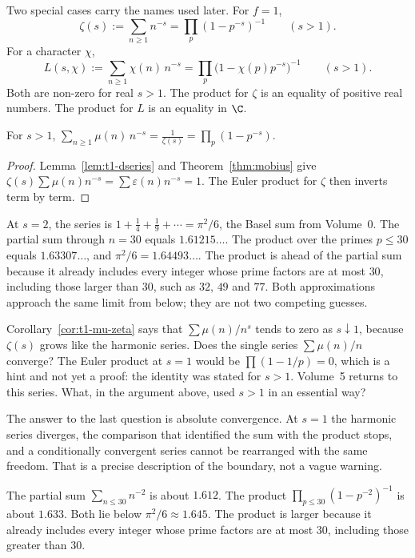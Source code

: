 Two special cases carry the names used later. For $f=1$,
\[
\zeta(s):=\sum_{n\ge1}n^{-s}=\prod_p(1-p^{-s})^{-1}\qquad(s>1).
\]
For a character $\chi$,
\[
L(s,\chi):=\sum_{n\ge1}\chi(n)\,n^{-s}=\prod_p\bigl(1-\chi(p)p^{-s}\bigr)^{-1}\qquad(s>1).
\]
Both are non-zero for real $s>1$. The product for $\zeta$ is an equality of positive real numbers. The product for $L$ is an equality in $\C$.

\begin{corollary}\label{cor:t1-mu-zeta}
For $s>1$, $\displaystyle\sum_{n\ge1}\mu(n)\,n^{-s}=\frac1{\zeta(s)}=\prod_p(1-p^{-s})$.
\end{corollary}
\begin{proof}
Lemma~\ref{lem:t1-dseries} and Theorem~\ref{thm:mobius} give $\zeta(s)\sum\mu(n)n^{-s}=\sum\varepsilon(n)n^{-s}=1$. The Euler product for $\zeta$ then inverts term by term.
\end{proof}

\begin{examplex}
At $s=2$, the series is $1+\frac14+\frac19+\cdots=\pi^2/6$, the Basel sum from Volume~0. The partial sum through $n=30$ equals $1.61215\ldots$. The product over the primes $p\le30$ equals $1.63307\ldots$, and $\pi^2/6=1.64493\ldots$. The product is ahead of the partial sum because it already includes every integer whose prime factors are at most $30$, including those larger than $30$, such as $32$, $49$ and $77$. Both approximations approach the same limit from below; they are not two competing guesses.
\end{examplex}

\begin{think}
Corollary~\ref{cor:t1-mu-zeta} says that $\sum\mu(n)/n^s$ tends to zero as $s\downarrow1$, because $\zeta(s)$ grows like the harmonic series. Does the single series $\sum\mu(n)/n$ converge? The Euler product at $s=1$ would be $\prod(1-1/p)=0$, which is a hint and not yet a proof: the identity was stated for $s>1$. Volume~5 returns to this series. What, in the argument above, used $s>1$ in an essential way?
\end{think}

The answer to the last question is absolute convergence. At $s=1$ the harmonic series diverges, the comparison that identified the sum with the product stops, and a conditionally convergent series cannot be rearranged with the same freedom. That is a precise description of the boundary, not a vague warning.

\begin{examplex}
The partial sum $\sum_{n\le 30}n^{-2}$ is about $1.612$. The product $\prod_{p\le 30}(1-p^{-2})^{-1}$ is about $1.633$. Both lie below $\pi^2/6\approx 1.645$. The product is larger because it already includes every integer whose prime factors are at most $30$, including those greater than $30$.
\end{examplex}

